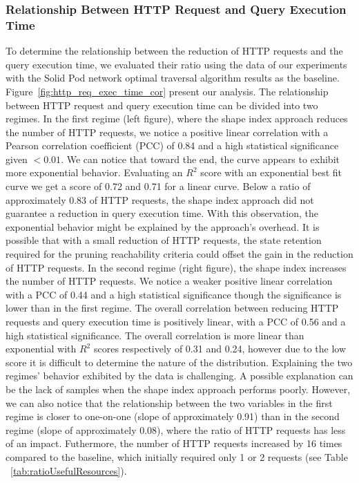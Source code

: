 \subsubsection{Relationship Between HTTP Request and Query Execution Time}

To determine the relationship between the reduction of HTTP requests and the query execution time, we evaluated their ratio using 
the data of our experiments with the Solid Pod network optimal traversal algorithm results as the baseline.
Figure~\ref{fig:http_req_exec_time_cor} present our analysis.
The relationship between HTTP request and query execution time can be divided into two regimes.
In the first regime (left figure), where the shape index approach reduces the number of HTTP requests, we notice a positive linear correlation with a
Pearson correlation coefficient (PCC) of 0.84 and a high statistical significance given $< 0.01$.
We can notice that toward the end, the curve appears to exhibit more exponential behavior.
Evaluating an $R^2$ score with an exponential best fit curve we get a score of 0.72 and 0.71 for a linear curve.
Below a ratio of approximately 0.83 of HTTP requests, the shape index approach did not guarantee a reduction in query execution time.
With this observation, the exponential behavior might be explained by the approach's overhead. 
It is possible that with a small reduction of HTTP requests, the state retention required for the pruning reachability criteria could offset the gain in the reduction of HTTP requests.
In the second regime (right figure), the shape index increases the number of HTTP requests.
We notice a weaker positive linear correlation with a PCC of 0.44 and a high statistical significance though the significance is lower than in the first regime.
The overall correlation between reducing HTTP requests and query execution time is positively linear, with a PCC of 0.56 and a high statistical significance.
The overall correlation is more linear than exponential with $R^2$ scores respectively of 0.31 and 0.24, however due to the low score it is difficult to determine the nature of the distribution.
Explaining the two regimes' behavior exhibited by the data is challenging.
A possible explanation can be the lack of samples when the shape index approach performs poorly.
However, we can also notice that the relationship between the two variables in the first regime is closer to one-on-one (slope of approximately 0.91) than in the second regime (slope of approximately 0.08), where the ratio of HTTP requests has less of an impact.
Futhermore, the number of HTTP requests increased by 16 times compared to the baseline, which initially required only 1 or 2 requests (see Table ~\ref{tab:ratioUsefulResources}). 
